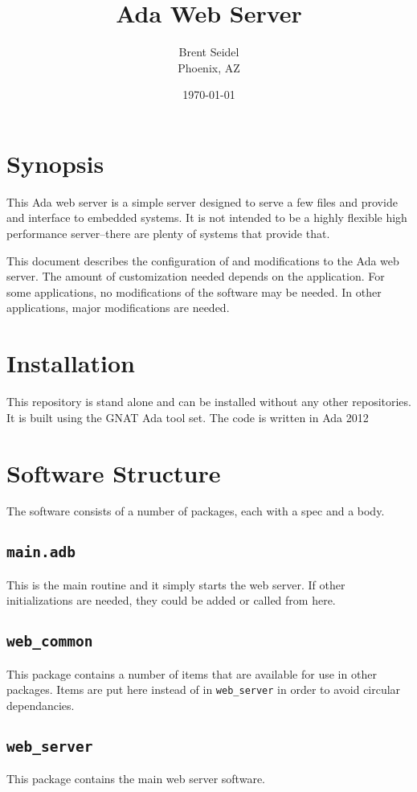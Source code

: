\documentclass[10pt, openany, draft]{article}
\title{Ada Web Server}
\author{Brent Seidel \\ Phoenix, AZ}
\date{ \today }
\begin{document}
\maketitle
\section{Synopsis}
This Ada web server is a simple server designed to serve a few files and provide and interface to embedded systems.  It is not intended to be a highly flexible high performance server--there are plenty of systems that provide that.

This document describes the configuration of and modifications to the Ada web server.  The amount of customization needed depends on the application.  For some applications, no modifications of the software may be needed.  In other applications, major modifications are needed.

\section{Installation}
This repository is stand alone and can be installed without any other repositories.  It is built using the GNAT Ada tool set.  The code is written in Ada 2012

\section{Software Structure}
The software consists of a number of packages, each with a spec and a body.

\subsection{\texttt{main.adb}}
This is the main routine and it simply starts the web server.  If other initializations are needed, they could be added or called from here.

\subsection{\texttt{web\_common}}
This package contains a number of items that are available for use in other packages.  Items are put here instead of in \texttt{web\_server} in order to avoid circular dependancies.

\subsection{\texttt{web\_server}}
This package contains the main web server software.
\end{document}
